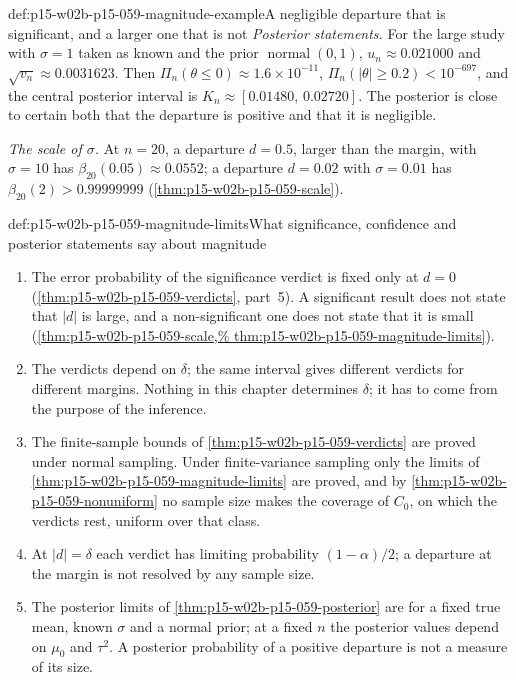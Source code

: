 \begin{hbexample}{def:p15-w02b-p15-059-magnitude-example}{A negligible departure that is significant, and a larger one that is not}
\emph{Posterior statements.} For the large study with \(\sigma=1\) taken as
known and the prior \(\operatorname{normal}(0,1)\),
\(u_n\approx0.021000\) and \(\sqrt{v_n}\approx0.0031623\). Then
\(\Pi_n(\theta\leq0)\approx1.6\times10^{-11}\),
\(\Pi_n(|\theta|\geq0.2)<10^{-697}\), and the central posterior interval
is \(K_n\approx[0.01480,\,0.02720]\). The posterior is close to certain both
that the departure is positive and that it is negligible.

\emph{The scale of \(\sigma\).} At \(n=20\), a departure \(d=0.5\), larger
than the margin, with \(\sigma=10\) has \(\beta_{20}(0.05)\approx0.0552\);
a departure \(d=0.02\) with \(\sigma=0.01\) has
\(\beta_{20}(2)>0.99999999\) (\cref{thm:p15-w02b-p15-059-scale}).
\end{hbexample}

\begin{hbwarning}{def:p15-w02b-p15-059-magnitude-limits}{What significance, confidence and posterior statements say about magnitude}
\begin{enumerate}
\item The error probability of the significance verdict is fixed only at
\(d=0\) (\cref{thm:p15-w02b-p15-059-verdicts}, part~5). A significant
result does not state that \(|d|\) is large, and a non-significant one does
not state that it is small (\cref{thm:p15-w02b-p15-059-scale,%
thm:p15-w02b-p15-059-magnitude-limits}).
\item The verdicts depend on \(\delta\); the same interval gives different
verdicts for different margins. Nothing in this chapter determines
\(\delta\); it has to come from the purpose of the inference.
\item The finite-sample bounds of \cref{thm:p15-w02b-p15-059-verdicts} are
proved under normal sampling. Under finite-variance sampling only the
limits of \cref{thm:p15-w02b-p15-059-magnitude-limits} are proved, and by
\cref{thm:p15-w02b-p15-059-nonuniform} no sample size makes the coverage of
\(C_0\), on which the verdicts rest, uniform over that class.
\item At \(|d|=\delta\) each verdict has limiting probability
\((1-\alpha)/2\); a departure at the margin is not resolved by any sample
size.
\item The posterior limits of \cref{thm:p15-w02b-p15-059-posterior} are for
a fixed true mean, known \(\sigma\) and a normal prior; at a fixed \(n\) the
posterior values depend on \(\mu_0\) and \(\tau^2\). A posterior
probability of a positive departure is not a measure of its size.
\end{enumerate}
\end{hbwarning}

